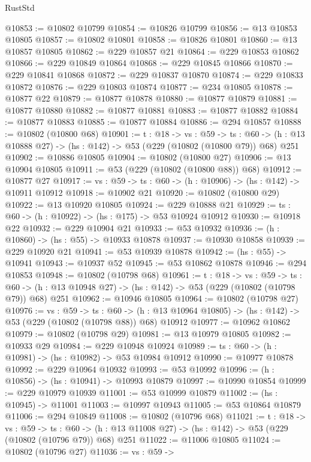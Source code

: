 \begin{lexlean}{RustStd}
\begin{coremodule}
@10853 := @10802 @10799
@10854 := @10826 @10799
@10856 := @13 @10853 @10805
@10857 := @10802 @10801
@10858 := @10826 @10801
@10860 := @13 @10857 @10805
@10862 := @229 @10857 @21
@10864 := @229 @10853 @10862
@10866 := @229 @10849 @10864
@10868 := @229 @10845 @10866
@10870 := @229 @10841 @10868
@10872 := @229 @10837 @10870
@10874 := @229 @10833 @10872
@10876 := @229 @10803 @10874
@10877 := @234 @10805
@10878 := @10877 @22
@10879 := @10877 @10878
@10880 := @10877 @10879
@10881 := @10877 @10880
@10882 := @10877 @10881
@10883 := @10877 @10882
@10884 := @10877 @10883
@10885 := @10877 @10884
@10886 := @294 @10857
@10888 := @10802 (@10800 @68)
@10901 := {t : @18} ->
  {vs : @59} ->
  {ts : @60} -> (h : @13 @10888 @27) -> (hs : @142) -> @53 (@229 (@10802 (@10800 @79)) @68) @251
@10902 := @10886 @10805
@10904 := @10802 (@10800 @27)
@10906 := @13 @10904 @10805
@10911 := @53 (@229 (@10802 (@10800 @88)) @68)
@10912 := @10877 @27
@10917 := {vs : @59} -> {ts : @60} -> (h : @10906) -> (hs : @142) -> @10911 @10912
@10918 := @10902 @21
@10920 := @10802 (@10800 @29)
@10922 := @13 @10920 @10805
@10924 := @229 @10888 @21
@10929 := {ts : @60} -> (h : @10922) -> (hs : @175) -> @53 @10924 @10912
@10930 := @10918 @22
@10932 := @229 @10904 @21
@10933 := @53 @10932
@10936 := (h : @10860) -> (hs : @55) -> @10933 @10878
@10937 := @10930 @10858
@10939 := @229 @10920 @21
@10941 := @53 @10939 @10878
@10942 := (hs : @55) -> @10941
@10943 := @10937 @52
@10945 := @53 @10862 @10878
@10946 := @294 @10853
@10948 := @10802 (@10798 @68)
@10961 := {t : @18} ->
  {vs : @59} ->
  {ts : @60} -> (h : @13 @10948 @27) -> (hs : @142) -> @53 (@229 (@10802 (@10798 @79)) @68) @251
@10962 := @10946 @10805
@10964 := @10802 (@10798 @27)
@10976 := {vs : @59} ->
  {ts : @60} ->
  (h : @13 @10964 @10805) -> (hs : @142) -> @53 (@229 (@10802 (@10798 @88)) @68) @10912
@10977 := @10962 @10862
@10979 := @10802 (@10798 @29)
@10981 := @13 @10979 @10805
@10982 := @10933 @29
@10984 := @229 @10948 @10924
@10989 := {ts : @60} -> (h : @10981) -> (hs : @10982) -> @53 @10984 @10912
@10990 := @10977 @10878
@10992 := @229 @10964 @10932
@10993 := @53 @10992
@10996 := (h : @10856) -> (hs : @10941) -> @10993 @10879
@10997 := @10990 @10854
@10999 := @229 @10979 @10939
@11001 := @53 @10999 @10879
@11002 := (hs : @10945) -> @11001
@11003 := @10997 @10943
@11005 := @53 @10864 @10879
@11006 := @294 @10849
@11008 := @10802 (@10796 @68)
@11021 := {t : @18} ->
  {vs : @59} ->
  {ts : @60} -> (h : @13 @11008 @27) -> (hs : @142) -> @53 (@229 (@10802 (@10796 @79)) @68) @251
@11022 := @11006 @10805
@11024 := @10802 (@10796 @27)
@11036 := {vs : @59} ->

\end{coremodule}
\end{lexlean}
